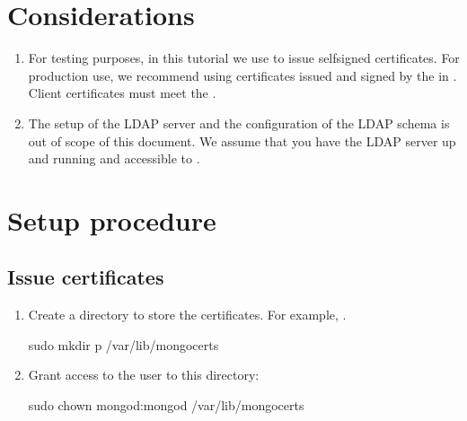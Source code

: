 \documentclass[letterpaper,10pt,english]{sphinxmanual}
\begin{document}
\section{Considerations}
\label{\detokenize{x509-ldap:considerations}}\begin{enumerate}
%
\item {} 
\sphinxAtStartPar
For testing purposes, in this tutorial we use  to issue self\sphinxhyphen{}signed certificates. For production use, we recommend using certificates issued and signed by the  in . Client certificates must meet the .

\item {} 
\sphinxAtStartPar
The setup of the LDAP server and the configuration of the LDAP schema is out of scope of this document. We assume that you have the LDAP server up and running and accessible to .

\end{enumerate}


\section{Setup procedure}
\label{\detokenize{x509-ldap:setup-procedure}}

\subsection{Issue certificates}
\label{\detokenize{x509-ldap:issue-certificates}}\begin{enumerate}
%
\item {} 
\sphinxAtStartPar
Create a directory to store the certificates. For example, .

\begin{sphinxVerbatim}[commandchars=\\\{\}]
\PYGZdl{} sudo mkdir \PYGZhy{}p /var/lib/mongocerts
\end{sphinxVerbatim}

\item {} 
\sphinxAtStartPar
Grant access to the  user to this directory:

\begin{sphinxVerbatim}[commandchars=\\\{\}]
\PYGZdl{} sudo chown mongod:mongod /var/lib/mongocerts
\end{sphinxVerbatim}

\end{enumerate}
\end{document}
